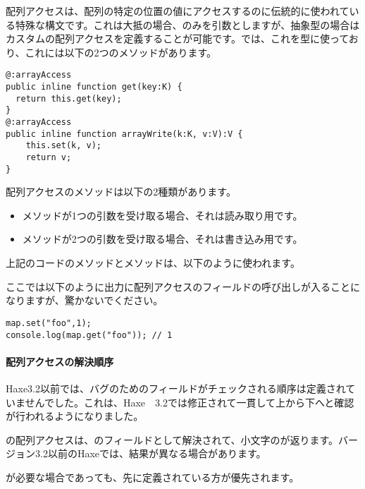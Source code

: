配列アクセスは、配列の特定の位置の値にアクセスするのに伝統的に使われている特殊な構文です。これは大抵の場合、のみを引数としますが、抽象型の場合はカスタムの配列アクセスを定義することが可能です。では、これを型に使っており、これには以下の2つのメソッドがあります。

\begin{lstlisting}
@:arrayAccess
public inline function get(key:K) {
  return this.get(key);
}
@:arrayAccess
public inline function arrayWrite(k:K, v:V):V {
	this.set(k, v);
	return v;
}
\end{lstlisting}

配列アクセスのメソッドは以下の2種類があります。

\begin{itemize}
	\item {}メソッドが1つの引数を受け取る場合、それは読み取り用です。
	\item {}メソッドが2つの引数を受け取る場合、それは書き込み用です。
\end{itemize}

上記のコードのメソッドとメソッドは、以下のように使われます。


ここでは以下のように出力に配列アクセスのフィールドの呼び出しが入ることになりますが、驚かないでください。

\begin{lstlisting}
map.set("foo",1);
console.log(map.get("foo")); // 1
\end{lstlisting}

\paragraph{配列アクセスの解決順序}
\label{types-abstract-array-access-order}

Haxe3.2以前では、バグのためのフィールドがチェックされる順序は定義されていませんでした。これは、Haxe　3.2では修正されて一貫して上から下へと確認が行われるようになりました。


の配列アクセスは、のフィールドとして解決されて、小文字のが返ります。バージョン3.2以前のHaxeでは、結果が異なる場合があります。

が必要な場合であっても、先に定義されている方が優先されます。

